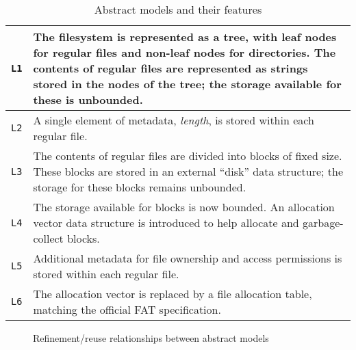 \documentclass[submission,copyright,creativecommons]{eptcs}
\begin{document}
\begin{table}[]
  \centering
  \caption{Abstract models and their features}
  \label{abstract-model-description-table}
  \begin{tabular}{|l|p{120mm}|}
    \hline
    \texttt{L1} & The filesystem is represented as a tree, with leaf
    nodes for regular files and non-leaf nodes for
    directories. The contents of regular files are represented as
    strings stored in the nodes of the tree; the storage available for
    these is unbounded. \\ \hline
    \texttt{L2} & A single element of metadata, \textit{length}, is
    stored within each regular file.  \\ \hline
    \texttt{L3} & The contents of regular files are divided into
    blocks of fixed size. These blocks are stored in an external
    ``disk'' data structure; the storage for these blocks remains
    unbounded. \\ \hline
    \texttt{L4} & The storage available for blocks is now bounded. An
    allocation vector data structure is introduced to help allocate
    and garbage-collect blocks. \\ \hline
    \texttt{L5} & Additional metadata for file ownership and access
    permissions is stored within each regular file. \\ \hline
    \texttt{L6} & The allocation vector is replaced by a file
    allocation table, matching the official FAT specification. \\ \hline
  \end{tabular}
\end{table}

\begin{figure}
  \centering
  \caption{Refinement/reuse relationships between abstract models}
  \label{refinement-figure}
\end{figure}
\end{document}
